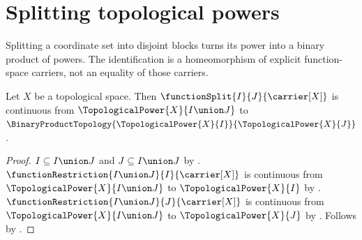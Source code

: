 \section{Splitting topological powers}





Splitting a coordinate set into disjoint blocks turns its power into a
binary product of powers. The identification is a homeomorphism of explicit
function-space carriers, not an equality of those carriers.

\begin{theorem}\label{topological_power_split_continuous}
    Let $X$ be a topological space.
    Then $\functionSplit{I}{J}{\carrier[X]}$ is continuous from
        $\TopologicalPower{X}{I\union J}$ to
        $\BinaryProductTopology{\TopologicalPower{X}{I}}{\TopologicalPower{X}{J}}$.
\end{theorem}
\begin{proof}
    $I\subseteq I\union J$ and $J\subseteq I\union J$ by .
    $\functionRestriction{I\union J}{I}{\carrier[X]}$ is continuous from
        $\TopologicalPower{X}{I\union J}$ to $\TopologicalPower{X}{I}$ by
        .
    $\functionRestriction{I\union J}{J}{\carrier[X]}$ is continuous from
        $\TopologicalPower{X}{I\union J}$ to $\TopologicalPower{X}{J}$ by
        .
    Follows by .
\end{proof}

